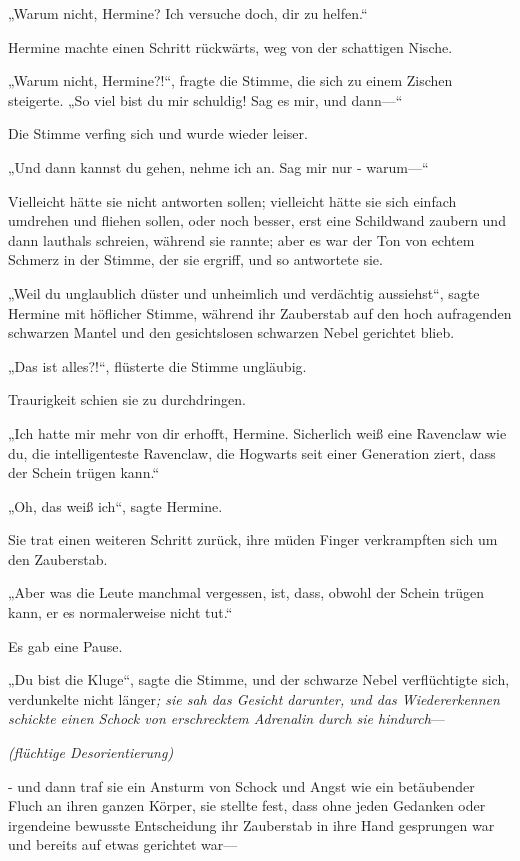 {„Warum nicht, Hermine? Ich versuche doch, dir zu helfen.“

Hermine machte einen Schritt rückwärts, weg von der schattigen Nische.

„Warum nicht, Hermine?!“, fragte die Stimme, die sich zu einem Zischen steigerte. „So viel bist du mir schuldig! Sag es mir, und dann—“

Die Stimme verfing sich und wurde wieder leiser.

„Und dann kannst du gehen, nehme ich an. Sag mir nur - warum—“

Vielleicht hätte sie nicht antworten sollen; vielleicht hätte sie sich einfach umdrehen und fliehen sollen, oder noch besser, erst eine Schildwand zaubern und dann lauthals schreien, während sie rannte; aber es war der Ton von echtem Schmerz in der Stimme, der sie ergriff, und so antwortete sie.

„Weil du unglaublich düster und unheimlich und verdächtig aussiehst“, sagte Hermine mit höflicher Stimme, während ihr Zauberstab auf den hoch aufragenden schwarzen Mantel und den gesichtslosen schwarzen Nebel gerichtet blieb.

„Das ist alles?!“, flüsterte die Stimme ungläubig.

Traurigkeit schien sie zu durchdringen.

„Ich hatte mir mehr von dir erhofft, Hermine. Sicherlich weiß eine Ravenclaw wie du, die intelligenteste Ravenclaw, die Hogwarts seit einer Generation ziert, dass der Schein trügen kann.“

„Oh, das weiß ich“, sagte Hermine.

Sie trat einen weiteren Schritt zurück, ihre müden Finger verkrampften sich um den Zauberstab.

„Aber was die Leute manchmal vergessen, ist, dass, obwohl der Schein trügen kann, er es normalerweise nicht tut.“

Es gab eine Pause.

„Du bist die Kluge“, sagte die Stimme, und der schwarze Nebel verflüchtigte sich, verdunkelte nicht länger\emph{; sie sah das Gesicht darunter, und das Wiedererkennen schickte einen Schock von erschrecktem Adrenalin durch sie hindurch}—

\emph{(flüchtige Desorientierung)}

\emph{\hfill\break } - und dann traf sie ein Ansturm von Schock und Angst wie ein betäubender Fluch an ihren ganzen Körper, sie stellte fest, dass ohne jeden Gedanken oder irgendeine bewusste Entscheidung ihr Zauberstab in ihre Hand gesprungen war und bereits auf etwas gerichtet war—

}
